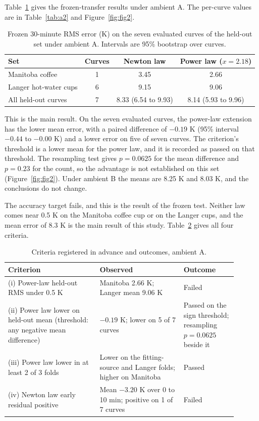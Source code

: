 \documentclass[11pt,letterpaper]{article}
\begin{document}
Table~\ref{tab:frozen} gives the frozen-transfer results under ambient A. The per-curve values are in Table~\ref{tab:a2} and Figure~\ref{fig:fig2}.

\begin{table}[!htbp]
  \centering
  \caption{Frozen 30-minute RMS error (K) on the seven evaluated curves of the held-out set under ambient A. Intervals are 95\% bootstrap over curves.}
  \label{tab:frozen}
  \begin{tabular}{lccc}
    \toprule
    Set & Curves & Newton law & Power law ($x = 2.18$) \\
    \midrule
    Manitoba coffee & 1 & 3.45 & 2.66 \\
    Langer hot-water cups & 6 & 9.15 & 9.06 \\
    All held-out curves & 7 & 8.33 (6.54 to 9.93) & 8.14 (5.93 to 9.96) \\
    \bottomrule
  \end{tabular}
\end{table}

This is the main result. On the seven evaluated curves, the power-law extension has the lower mean error, with a paired difference of $-0.19$ K (95\% interval $-0.44$ to $-0.00$ K) and a lower error on five of seven curves. The criterion's threshold is a lower mean for the power law, and it is recorded as passed on that threshold. The resampling test gives $p = 0.0625$ for the mean difference and $p = 0.23$ for the count, so the advantage is not established on this set (Figure~\ref{fig:fig2}). Under ambient B the means are 8.25 K and 8.03 K, and the conclusions do not change.

The accuracy target fails, and this is the result of the frozen test. Neither law comes near 0.5 K on the Manitoba coffee cup or on the Langer cups, and the mean error of 8.3 K is the main result of this study. Table~\ref{tab:criteria} gives all four criteria.

\begin{table}[!htbp]
  \centering
  \caption{Criteria registered in advance and outcomes, ambient A.}
  \label{tab:criteria}
  \begin{tabular}{p{0.36\linewidth}p{0.33\linewidth}p{0.21\linewidth}}
    \toprule
    Criterion & Observed & Outcome \\
    \midrule
    (i) Power-law held-out RMS under 0.5 K & Manitoba 2.66 K; Langer mean 9.06 K & Failed \\
    (ii) Power law lower on held-out mean (threshold: any negative mean difference) & $-0.19$ K; lower on 5 of 7 curves & Passed on the sign threshold; resampling $p = 0.0625$ beside it \\
    (iii) Power law lower in at least 2 of 3 folds & Lower on the fitting-source and Langer folds; higher on Manitoba & Passed \\
    (iv) Newton law early residual positive & Mean $-3.20$ K over 0 to 10 min; positive on 1 of 7 curves & Failed \\
    \bottomrule
  \end{tabular}
\end{table}
\end{document}
